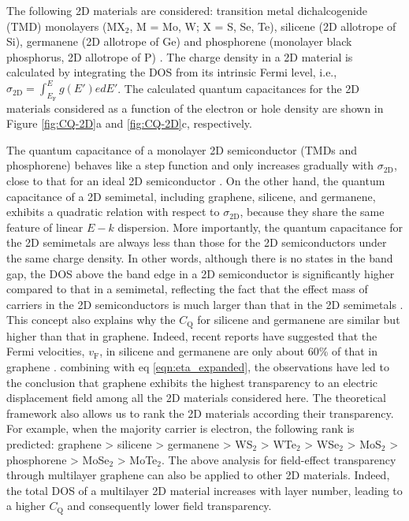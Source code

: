 \documentclass[journal=nalefd]{achemso}
\newcommand*\subs[1]{_{\text{#1}}} %
\newcommand*\change[1]{{#1}}
\begin{document}
The following 2D materials are considered:  transition metal dichalcogenide (TMD) 
monolayers (MX$\subs{2}$, M = Mo, W; X = S, Se, Te), silicene (2D allotrope of Si), germanene (2D allotrope of Ge)
\change{
  and phosphorene (monolayer black phosphorus, 2D allotrope of P)
}.
The charge density in a 2D material is calculated by integrating the DOS from its intrinsic Fermi level, i.e., $\sigma\subs{2D}=\int_{E\subs{F}}^{E}  g(E')e dE'$.
The calculated quantum capacitances for the 2D materials considered as a function of the electron or hole density are shown in Figure \ref{fig:CQ-2D}a and \ref{fig:CQ-2D}c, respectively. 

The quantum capacitance of a monolayer 2D semiconductor (\change{TMDs and phosphorene}) behaves like a step function and only increases gradually with $\sigma\subs{2D}$, close to that for an ideal 2D semiconductor \cite{Davies1997Physics}. 
On the other hand, the quantum capacitance of a 2D semimetal, including graphene, silicene, and germanene, exhibits a quadratic relation with respect to $\sigma\subs{2D}$, because they share the same feature of linear $E-k$ dispersion. 
More importantly, the quantum capacitance for the 2D semimetals are always less than those for the 2D semiconductors under the same charge density. In other words, although there is no states in the band gap, the DOS above the band edge in a 2D semiconductor is significantly higher compared to that in a semimetal, reflecting the fact that the effect mass of carriers in the 2D semiconductors is much larger than that in the 2D semimetals \cite{Davies1997Physics}. 
This concept also explains why the $C\subs{Q}$ for silicene and germanene are similar but higher than that in graphene. Indeed, recent reports have suggested that the Fermi velocities, $v\subs{F}$, in silicene and germanene are only about 60\% of that in graphene \cite{yan2013electron,bechstedt2012infrared}. 
combining with eq \ref{eqn:eta_expanded}, the observations have led to the conclusion that graphene exhibits the highest transparency to an electric displacement field among all the 2D materials considered here.
The theoretical framework also allows us to rank the 2D materials according their transparency. For example, when the majority carrier is electron, the following rank is predicted: 
\change{graphene > silicene > germanene > WS$\subs{2}$ > WTe$\subs{2}$ > WSe$\subs{2}$ > MoS$\subs{2}$ > phosphorene > MoSe$\subs{2}$ > MoTe$\subs{2}$.
}
\change{
The above analysis for field-effect transparency through multilayer graphene can also be applied to other 2D materials. 
Indeed, the total DOS of a multilayer 2D material increases with layer number, leading to a higher $C\subs{Q}$ and consequently lower field transparency.
}
\end{document}
